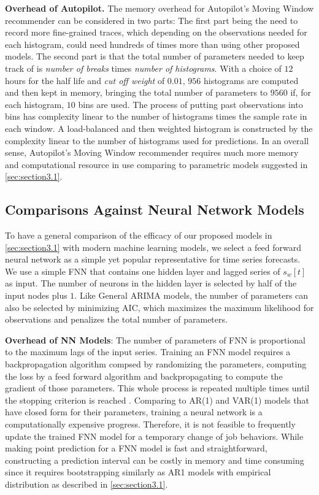 \documentclass[sigplan,10pt,review,anonymous]{acmart}
\begin{document}
\textbf{Overhead of Autopilot.} The memory overhead for Autopilot's Moving
Window recommender can be considered in two parts: The first part being the need
to record more fine-grained traces, which depending on the observations needed
for each histogram, could need hundreds of times more than using other proposed
models. The second part is that the total number of parameters needed to keep
track of is \textit{number of breaks} times \textit{number of histograms}. With
a choice of $12$ hours for the half life and \textit{cut off weight} of $0.01$,
$956$ histograms are computed and then kept in memory, bringing the total number
of parameters to $9560$ if, for each histogram, $10$ bins are used. The process
of putting past observations into bins has complexity linear to the number of
histograms times the sample rate in each window. A load-balanced and then
weighted histogram is constructed by the complexity linear to the number of
histograms used for predictions. In an overall sense, Autopilot's Moving Window
recommender requires much more memory and computational resource in use
comparing to parametric models suggested in \cref{sec:section3.1}.

\subsection{Comparisons Against Neural Network Models}

To have a general comparison of the efficacy of our proposed models in
\cref{sec:section3.1} with modern machine learning models, we select a feed
forward neural network as a simple yet popular representative for time series
forecasts. We use a simple FNN that contains one hidden layer and lagged series
of $s_w[t]$ as input. The number of neurons in the hidden layer is selected by
half of the input nodes plus $1$. Like General ARIMA models, the number of
parameters can also be selected by minimizing AIC, which maximizes the maximum
likelihood for observations and penalizes the total number of parameters.

\textbf{Overhead of NN Models}: The number of parameters of FNN is proportional
to the maximum lags of the input series. Training an FNN model requires a
backpropagation algorithm compsed by randomizing the parameters, computing the
loss by a feed forward algorithm and backpropagating to compute the gradient of
those parameters. This whole process is repeated multiple times until the
stopping criterion is reached \cite{5.4.374}. Comparing to AR(1) and VAR(1)
models that have closed form for their parameters, training a neural network is
a computationally expensive progress. Therefore, it is not feasible to
frequently update the trained FNN model for a temporary change of job behaviors.
While making point prediction for a FNN model is fast and straightforward,
constructing a prediction interval can be costly in memory and time consuming
since it requires bootstrapping similarly as AR1 models with empirical
distribution as described in \cref{sec:section3.1}. 
\end{document}
